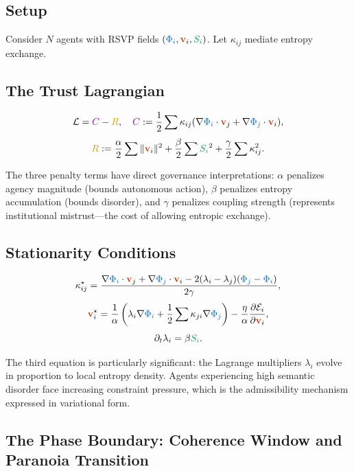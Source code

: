 \documentclass[11pt,a4paper]{article}
\newcommand{\scalar}[1]{\textcolor{scalarcolor}{\ensuremath{#1}}}
\newcommand{\vect}[1]{\textcolor{vectorcolor}{\ensuremath{\mathbf{#1}}}}
\newcommand{\entropy}[1]{\textcolor{entropycolor}{\ensuremath{#1}}}
\newcommand{\coherence}[1]{\textcolor{coherencecolor}{\ensuremath{#1}}}
\newcommand{\risk}[1]{\textcolor{riskcolor}{\ensuremath{#1}}}
\theoremstyle{definition}
\theoremstyle{plain}
\begin{document}
\begin{mdframed}[style=appendixbox]

\subsection{Setup}
Consider $N$ agents with RSVP fields $(\scalar{\Phi_i}, \vect{v}_i, \entropy{S_i})$. Let $\kappa_{ij}$ mediate entropy exchange.

\subsection{The Trust Lagrangian}
\[
\mathcal{L} = \coherence{C} - \risk{R}, \quad
\coherence{C} := \frac{1}{2}\sum \kappa_{ij}(\nabla\scalar{\Phi_i}\cdot \vect{v}_j + \nabla\scalar{\Phi_j}\cdot \vect{v}_i),
\]
\[
\risk{R} := \frac{\alpha}{2}\sum \|\vect{v}_i\|^2 + \frac{\beta}{2}\sum \entropy{S_i}^2 + \frac{\gamma}{2}\sum \kappa_{ij}^2.
\]

The three penalty terms have direct governance interpretations: $\alpha$ penalizes agency magnitude (bounds autonomous action), $\beta$ penalizes entropy accumulation (bounds disorder), and $\gamma$ penalizes coupling strength (represents institutional mistrust---the cost of allowing entropic exchange).

\subsection{Stationarity Conditions}
\[
\kappa_{ij}^{\star}=\frac{\nabla\scalar{\Phi_i}\cdot \vect{v}_j + \nabla\scalar{\Phi_j}\cdot \vect{v}_i - 2(\lambda_i-\lambda_j)(\scalar{\Phi_j}-\scalar{\Phi_i})}{2\gamma},
\]
\[
\vect{v}_i^{\star}=\frac{1}{\alpha}\left(\lambda_i\nabla\scalar{\Phi_i} + \frac{1}{2}\sum \kappa_{ji}\nabla\scalar{\Phi_j}\right) - \frac{\eta}{\alpha}\frac{\partial \mathcal{E}_i}{\partial \vect{v}_i},
\]
\[
\partial_t \lambda_i = \beta \entropy{S_i}.
\]

The third equation is particularly significant: the Lagrange multipliers $\lambda_i$ evolve in proportion to local entropy density. Agents experiencing high semantic disorder face increasing constraint pressure, which is the admissibility mechanism expressed in variational form.

\subsection{The Phase Boundary: Coherence Window and Paranoia Transition}


\end{mdframed}
\end{document}
